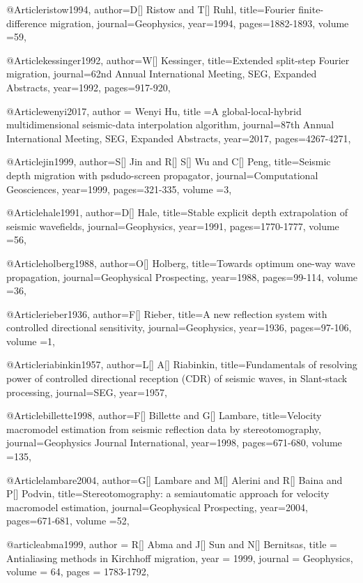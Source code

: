 @Article{ristow1994,
author={D[] Ristow and T[] Ruhl},
title={{F}ourier finite-difference migration},
journal={Geophysics},
year=1994,
pages={1882-1893},
volume ={59},
}

@Article{kessinger1992,
author={W[] Kessinger},
title={Extended split-step {F}ourier migration},
journal={62nd Annual International Meeting, SEG, Expanded Abstracts},
year=1992,
pages={917-920},
}

@Article{wenyi2017,
  author = {Wenyi Hu},
  title ={A global-local-hybrid multidimensional seismic-data interpolation algorithm},
  journal={87th Annual International Meeting, SEG, Expanded Abstracts},
  year=2017,
  pages={4267-4271},
}



@Article{jin1999,
author={S[] Jin and R[] S[] Wu and C[] Peng},
title={Seismic depth migration with psdudo-screen propagator},
journal={Computational Geosciences},
year=1999,
pages={321-335},
volume ={3},
}

@Article{hale1991,
author={D[] Hale},
title={Stable explicit depth extrapolation of seismic wavefields},
journal={Geophysics},
year=1991,
pages={1770-1777},
volume ={56},
}

@Article{holberg1988,
author={O[] Holberg},
title={Towards optimum one-way wave propagation},
journal={Geophysical Prospecting},
year=1988,
pages={99-114},
volume ={36},
}

@Article{rieber1936,
author={F[] Rieber},
title={A new reflection system with controlled directional sensitivity},
journal={Geophysics},
year=1936,
pages={97-106},
volume ={1},
}


@Article{riabinkin1957,
author={L[] A[] Riabinkin},
title={Fundamentals of resolving power of controlled directional reception (CDR) of seismic waves, in Slant-stack processing},
journal={SEG},
year=1957,
}

@Article{billette1998,
author={F[] Billette and G[] Lambare},
title={Velocity macromodel estimation from seismic reflection data by stereotomography},
journal={Geophysics Journal International},
year=1998,
pages={671-680},
volume ={135},
}

@Article{lambare2004,
author={G[] Lambare and M[] Alerini and R[] Baina and P[] Podvin},
title={Stereotomography: a semiautomatic approach for velocity macromodel estimation},
journal={Geophysical Prospecting},
year=2004,
pages={671-681},
volume ={52},
}

@article{abma1999,
  author =	 {R[] Abma and J[] Sun and N[] Bernitsas},
  title =	 {Antialiasing methods in Kirchhoff migration},
  year =	 1999,
  journal =	 {Geophysics},
  volume =	 64,
  pages =	 {1783-1792},
}

